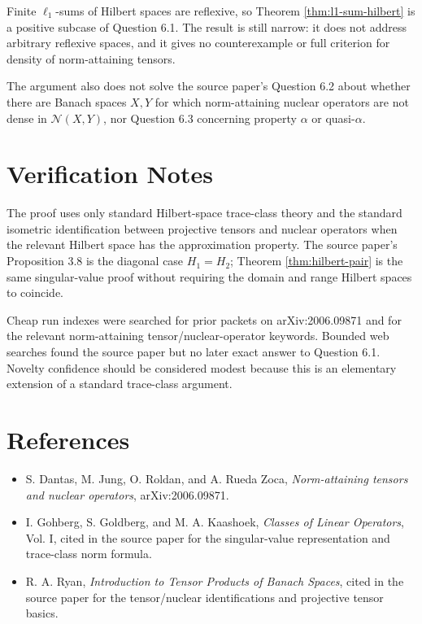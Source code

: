 \documentclass[11pt]{article}
\theoremstyle{remark}
\newcommand{\Nuc}{\mathcal N}
\begin{document}
Finite \(\ell_1\)-sums of Hilbert spaces are reflexive, so Theorem
\ref{thm:l1-sum-hilbert} is a positive subcase of Question 6.1.  The result is
still narrow: it does not address arbitrary reflexive spaces, and it gives no
counterexample or full criterion for density of norm-attaining tensors.

The argument also does not solve the source paper's Question 6.2 about whether
there are Banach spaces \(X,Y\) for which norm-attaining nuclear operators are
not dense in \(\Nuc(X,Y)\), nor Question 6.3 concerning property \(\alpha\) or
quasi-\(\alpha\).

\section{Verification Notes}

The proof uses only standard Hilbert-space trace-class theory and the standard
isometric identification between projective tensors and nuclear operators when
the relevant Hilbert space has the approximation property.  The source paper's
Proposition 3.8 is the diagonal case \(H_1=H_2\); Theorem
\ref{thm:hilbert-pair} is the same singular-value proof without requiring the
domain and range Hilbert spaces to coincide.

Cheap run indexes were searched for prior packets on arXiv:2006.09871 and for
the relevant norm-attaining tensor/nuclear-operator keywords.  Bounded web
searches found the source paper but no later exact answer to Question 6.1.
Novelty confidence should be considered modest because this is an elementary
extension of a standard trace-class argument.

\section{References}

\begin{itemize}
  \item S. Dantas, M. Jung, O. Roldan, and A. Rueda Zoca,
  \emph{Norm-attaining tensors and nuclear operators}, arXiv:2006.09871.
  \item I. Gohberg, S. Goldberg, and M. A. Kaashoek,
  \emph{Classes of Linear Operators}, Vol. I, cited in the source paper for
  the singular-value representation and trace-class norm formula.
  \item R. A. Ryan, \emph{Introduction to Tensor Products of Banach Spaces},
  cited in the source paper for the tensor/nuclear identifications and
  projective tensor basics.
\end{itemize}
\end{document}

